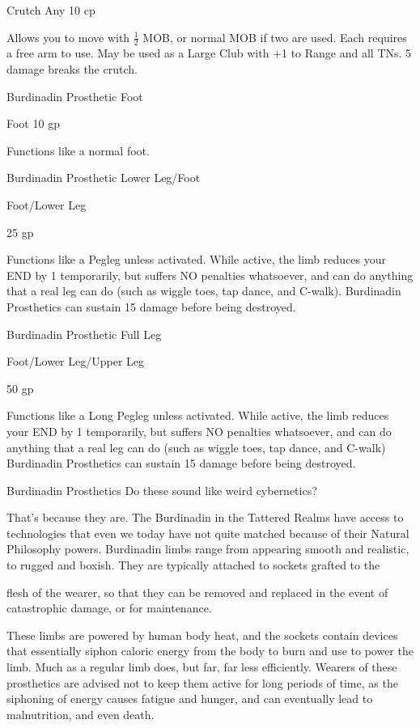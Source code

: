 \documentclass[oneside,11pt,english]{book}
\begin{document}
Crutch Any 10 
cp 

Allows you to move with $ \frac{1}{2} $ MOB, or normal MOB if two are used. 
Each requires a free arm to use. May be used as a Large Club with +1 to 
Range and all TNs. 5 damage breaks the crutch. 

Burdinadin 
Prosthetic Foot 

Foot 10 
gp 

Functions like a normal foot. 

Burdinadin 
Prosthetic 
Lower Leg/Foot 

Foot/Lower 
Leg 

25 
gp 

Functions like a Pegleg unless activated. While active, the limb reduces 
your END by 1 temporarily, but suffers NO penalties whatsoever, and 
can do anything that a real leg can do (such as wiggle toes, tap dance, 
and C-walk). Burdinadin Prosthetics can sustain 15 damage before 
being destroyed. 

Burdinadin 
Prosthetic Full 
Leg 

Foot/Lower 
Leg/Upper 
Leg 

50 
gp 

Functions like a Long Pegleg unless activated. While active, the limb 
reduces your END by 1 temporarily, but suffers NO penalties 
whatsoever, and can do anything that a real leg can do (such as wiggle 
toes, tap dance, and C-walk) Burdinadin Prosthetics can sustain 15 
damage before being destroyed. 

 

Burdinadin Prosthetics 
Do these sound like weird cybernetics? 

 

That’s because they are. The Burdinadin in the Tattered Realms have access to technologies that even we 
today have not quite matched because of their Natural Philosophy powers. Burdinadin limbs range from 
appearing smooth and realistic, to rugged and boxish. They are typically attached to sockets grafted to the 


flesh of the wearer, so that they can be removed and replaced in the event of catastrophic damage, or for 
maintenance. 

 

These limbs are powered by human body heat, and the sockets contain devices that essentially siphon 
caloric energy from the body to burn and use to power the limb. Much as a regular limb does, but far, far 
less efficiently. Wearers of these prosthetics are advised not to keep them active for long periods of time, 
as the siphoning of energy causes fatigue and hunger, and can eventually lead to malnutrition, and even 
death. 
\end{document}
